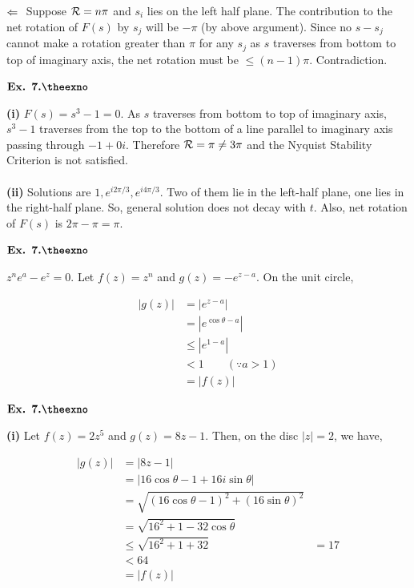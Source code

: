 \documentclass{article}
\def\tf{\textbf}
\def\mc{\ensuremath\mathcal}
\def\Lto{\ensuremath\Leftarrow\ }
\newcounter{exno}
\begin{document}
$\Lto$ Suppose $\mc{R}=n\pi$ and $s_i$ lies on the left half plane. The contribution to the net rotation of $F(s)$ by $s_j$ will be $-\pi$ (by above argument). Since no $s-s_j$ cannot make a rotation greater than $\pi$ for any $s_j$ as $s$ traverses from bottom to top of imaginary axis, the net rotation must be $\leq (n-1)\pi$. Contradiction.

\vspace{0.2in}

${\textbf{Ex. 7.\theexno}}$
\addtocounter{exno}{1}

\tf{(i)} $F(s)=s^3-1=0$. As $s$ traverses from bottom to top of imaginary axis, $s^3-1$ traverses from the top to the bottom of a line parallel to imaginary axis passing through $-1+0i$. Therefore $\mc{R}=\pi \neq 3\pi$ and the Nyquist Stability Criterion is not satisfied.\\~\\

\tf{(ii)} Solutions are $1,e^{i2\pi/3},e^{i4\pi/3}$. Two of them lie in the left-half plane, one lies in the right-half plane. So, general solution does not decay with $t$. Also, net rotation of $F(s)$ is $2\pi-\pi=\pi$.

\vspace{0.2in}

${\textbf{Ex. 7.\theexno}}$
\addtocounter{exno}{1}

$z^ne^a - e^z = 0$. Let $f(z)=z^n$ and $g(z) = -e^{z-a}$. On the unit circle,

\begin{align*}
    |g(z)| &= |e^{z-a}|\\
    &= |e^{\cos\theta-a}|\\
    &\leq |e^{1-a}|\\
    &<1 \qquad (\because a > 1)\\
    &=|f(z)| 
\end{align*}

\vspace{0.2in}

${\textbf{Ex. 7.\theexno}}$
\addtocounter{exno}{1}

\tf{(i)} Let $f(z) = 2z^5$ and $g(z) = 8z-1$. Then, on the disc $|z|=2$, we have,

\begin{align*}
    |g(z)| &= |8z-1|\\
    &= |16\cos\theta-1 + 16i\sin\theta|\\
    &= \sqrt{(16\cos\theta-1)^2 + (16\sin\theta)^2}\\
    &= \sqrt{16^2 + 1 - 32\cos\theta}\\
    &\leq \sqrt{16^2+1+32}
    &= 17\\
    &< 64\\
    &= |f(z)|
\end{align*}
\end{document}
